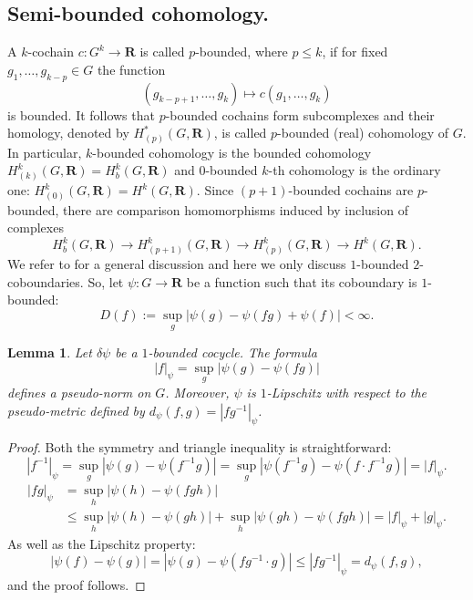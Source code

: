 \documentclass[11pt]{amsart}
\newtheorem{lemma}[subsection]{Lemma}
\theoremstyle{definition}
\theoremstyle{remark}
\numberwithin{equation}{section}
\numberwithin{figure}{section}
\newcommand{\B}[1]{{\mathbf #1}}
\begin{document}
\subsection*{Semi-bounded cohomology.}
A $k$-cochain $c\colon G^k\to \B R$ is called $p$-bounded, where $p\leq k$, if for
fixed $g_1,\ldots,g_{k-p}\in G$ the function
$$
(g_{k-p+1},\ldots,g_k)\mapsto c(g_1,\ldots,g_k)
$$
is bounded. It follows that $p$-bounded cochains form subcomplexes and their
homology, denoted by $H^*_{(p)}(G,\B R)$, is called $p$-bounded (real)
cohomology of $G$. In particular, $k$-bounded cohomology is the bounded
cohomology $H^k_{(k)}(G,\B R)=H^k_b(G,\B R)$ and $0$-bounded $k$-th cohomology
is the ordinary one: $H^k_{(0)}(G,\B R) = H^k(G,\B R)$. Since $(p+1)$-bounded
cochains are $p$-bounded, there are comparison homomorphisms induced by
inclusion of complexes
$$
H^k_b(G,\B R)\to H^k_{(p+1)}(G,\B R)\to H^k_{(p)}(G,\B R)\to H^k(G,\B R).
$$
We refer to \cite{arXiv:2208.03168} for a general discussion and here we only discuss
$1$-bounded $2$-coboundaries. So, let $\psi\colon G\to \B R$ be a function
such that its coboundary is $1$-bounded:
$$
D(f):=\sup_{g}|\psi(g) - \psi(fg) + \psi(f)| <\infty.
$$

\begin{lemma}\label{L:psi-norm}
Let $\delta\psi$ be a $1$-bounded cocycle.
The formula
$$
|f|_{\psi} = \sup_g|\psi(g)-\psi(fg)|
$$
defines a pseudo-norm on $G$. Moreover, $\psi$ is $1$-Lipschitz with
respect to the pseudo-metric defined by $d_{\psi}(f,g) = |fg^{-1}|_{\psi}$.
\end{lemma}

\begin{proof}
Both the symmetry and triangle inequality is straightforward:
$$
|f^{-1}|_{\psi} = \sup_g|\psi(g)-\psi(f^{-1}g)| = \sup_g |\psi(f^{-1}g)-\psi(f\cdot f^{-1}g)|=|f|_{\psi}.
$$
\begin{align*}
|fg|_{\psi} &= \sup_h|\psi(h)-\psi(fgh)|\\
&\leq \sup_h|\psi(h)-\psi(gh)|+\sup_h|\psi(gh)-\psi(fgh)|
=|f|_{\psi}+|g|_{\psi}.
\end{align*}
As well as the Lipschitz property:
$$
|\psi(f)-\psi(g)| = |\psi(g)-\psi(fg^{-1}\cdot g)| \leq |fg^{-1}|_{\psi} = d_{\psi}(f,g),
$$
and the proof follows.
\end{proof}
\end{document}

